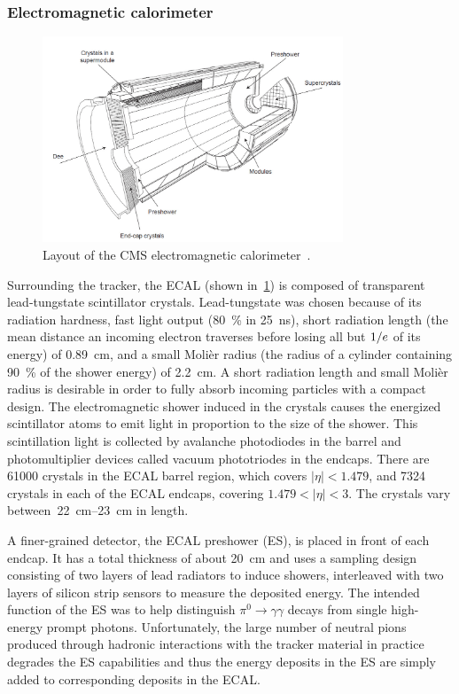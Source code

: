 \subsubsection{Electromagnetic calorimeter}
\begin{figure}[htb]
  \centering
  \includegraphics[width=0.8\textwidth]{figures/ecal}
  \caption[Layout of the CMS electromagnetic calorimeter]{Layout of the CMS electromagnetic calorimeter~\cite{1748-0221-3-08-S08004}.}
  \label{fig:ecal}
\end{figure}
Surrounding the tracker, the ECAL (shown in~\cref{fig:ecal}) is composed of
transparent lead-tungstate scintillator crystals. Lead-tungstate was chosen
because of its radiation hardness, fast light output (\SI{80}{\percent} in
\SI{25}{\nano\second}), short radiation length (the mean distance an incoming
electron traverses before losing all but $1/e$ of its energy) of
\SI{0.89}{\centi\meter}, and a small Moli\`er radius (the radius of a cylinder
containing \SI{90}{\percent} of the shower energy) of \SI{2.2}{\centi\meter}. A
short radiation length and small Moli\`er radius is desirable in order to fully
absorb incoming particles with a compact design. The electromagnetic shower
induced in the crystals causes the energized scintillator atoms to emit light in
proportion to the size of the shower. This scintillation light is collected by
avalanche photodiodes in the barrel and photomultiplier devices called vacuum
phototriodes in the endcaps. There are \num{61000} crystals in the ECAL barrel
region, which covers $|\eta| < 1.479$, and \num{7324} crystals in each of the
ECAL endcaps, covering $1.479 < |\eta| < 3$. The crystals vary
between~\SIrange{22}{23}{\centi\meter} in length.

A finer-grained detector, the ECAL preshower (ES), is placed in front of each
endcap. It has a total thickness of about \SI{20}{\centi\meter} and uses a
sampling design consisting of two layers of lead radiators to induce showers,
interleaved with two layers of silicon strip sensors to measure the deposited
energy. The intended function of the ES was to help distinguish $\pi^0
\rightarrow \gamma\gamma$ decays from single high-energy prompt photons.
Unfortunately, the large number of neutral pions produced through hadronic
interactions with the tracker material in practice degrades the ES capabilities
and thus the energy deposits in the ES are simply added to corresponding
deposits in the ECAL.


